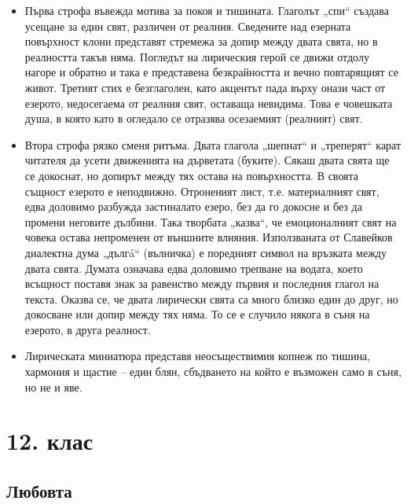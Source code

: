 \documentclass[12pt,a4paper]{article}
\begin{document}
\vspace{0.1cm}
\begin{itemize}[leftmargin=*, noitemsep, topsep=2pt, parsep=0pt]
    \item Първа строфа въвежда мотива за покоя и тишината. Глаголът „спи“ създава усещане за един свят, различен от реалния. Сведените над езерната повърхност клони представят стремежа за допир между двата свята, но в реалността такъв няма. Погледът на лирическия герой се движи отдолу нагоре и обратно и така е представена безкрайността и вечно повтарящият се живот. Третият стих е безглаголен, като акцентът пада върху онази част от езерото, недосегаема от реалния свят, оставаща невидима. Това е човешката душа, в която като в огледало се отразява осезаемият (реалният) свят.
    \vspace{0.1cm}
    \item Втора строфа рязко сменя ритъма. Двата глагола „шепнат“ и „треперят“ карат читателя да усети движенията на дърветата (буките). Сякаш двата свята ще се докоснат, но допирът между тях остава на повърхността. В своята същност езерото е неподвижно. Отроненият лист, т.е. материалният свят, едва доловимо разбужда застиналато езеро, без да го докосне и без да промени неговите дълбини. Така творбата „казва“, че емоционалният свят на човека остава непроменен от външните влияния. Използваната от Славейков диалектна дума „дългá“ (вълничка) е поредният символ на връзката между двата свята. Думата означава едва доловимо трепване на водата, което всъщност поставя знак за равенство между първия и последния глагол на текста. Оказва се, че двата лирически свята са много близко един до друг, но докосване или допир между тях няма. То се е случило някога в съня на езерото, в друга реалност.
    \vspace{0.1cm}
    \item Лирическата миниатюра представя неосъществимия копнеж по тишина, хармония и щастие – един блян, сбъдването на който е възможен само в съня, но не и яве.
\end{itemize}

\newpage

\section{12. клас}

\subsection{Любовта}
\end{document}

